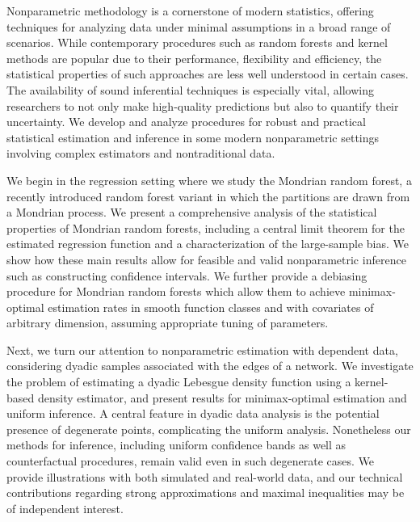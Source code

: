 

Nonparametric methodology is a cornerstone of modern statistics, offering
techniques for analyzing data under minimal assumptions in a broad range of
scenarios. While contemporary procedures such as random forests and kernel
methods are popular due to their performance, flexibility and efficiency, the
statistical properties of such approaches are less well understood in certain
cases. The availability of sound inferential techniques is especially vital,
allowing researchers to not only make high-quality predictions but also to
quantify their uncertainty. We develop and analyze procedures for robust and
practical statistical estimation and inference in some modern nonparametric
settings involving complex estimators and nontraditional data.

We begin in the regression setting where we study the Mondrian random forest, a
recently introduced random forest variant in which the partitions are drawn
from a Mondrian process. We present a comprehensive analysis of the statistical
properties of Mondrian random forests, including a central limit theorem for
the estimated regression function and a characterization of the large-sample
bias. We show how these main results allow for feasible and valid nonparametric
inference such as constructing confidence intervals. We further provide a
debiasing procedure for Mondrian random forests which allow them to achieve
minimax-optimal estimation rates in smooth function classes and with covariates
of arbitrary dimension, assuming appropriate tuning of parameters.

Next, we turn our attention to nonparametric estimation with dependent data,
considering dyadic samples associated with the edges of a network. We
investigate the problem of estimating a dyadic Lebesgue density function using
a kernel-based density estimator, and present results for minimax-optimal
estimation and uniform inference. A central feature in dyadic data analysis is
the potential presence of degenerate points, complicating the uniform analysis.
Nonetheless our methods for inference, including uniform confidence bands as
well as counterfactual procedures, remain valid even in such degenerate cases.
We provide illustrations with both simulated and real-world data, and our
technical contributions regarding strong approximations and maximal
inequalities may be of independent interest.

